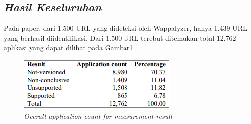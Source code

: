 \subsection{\textit{Hasil Keseluruhan}}
Pada paper\cite{pascal}, dari 1.500 URL yang dideteksi oleh Wappalyzer, hanya 1.439 URL yang berhasil diidentifikasi. Dari 1.500 URL terebut ditemukan total 12.762 aplikasi yang dapat dilihat pada Gambar\ref{fig:apr}
\begin{figure}[H]
	\centering  
	\includegraphics[scale=0.9]{Gambar/application_count_result.PNG}  
	\caption{ \textit{Overall application count for measurement result}} 
	\label{fig:apr} 
\end{figure} 
